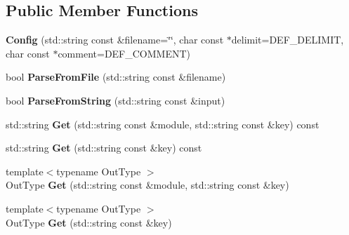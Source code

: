 \subsection*{Public Member Functions}
\begin{DoxyCompactItemize}
\item 
\hypertarget{classlsf_1_1util_1_1Config_a4d2115b08efe9a4025522d699b724623}{
{\bfseries Config} (std::string const \&filename=\char`\"{}\char`\"{}, char const $\ast$delimit=DEF\_\-DELIMIT, char const $\ast$comment=DEF\_\-COMMENT)}
\label{classlsf_1_1util_1_1Config_a4d2115b08efe9a4025522d699b724623}

\item 
\hypertarget{classlsf_1_1util_1_1Config_a1e5580078518ee262f8028c4a170ceb3}{
bool {\bfseries ParseFromFile} (std::string const \&filename)}
\label{classlsf_1_1util_1_1Config_a1e5580078518ee262f8028c4a170ceb3}

\item 
\hypertarget{classlsf_1_1util_1_1Config_a218bd716ead97bea8f600a3ff28b2a86}{
bool {\bfseries ParseFromString} (std::string const \&input)}
\label{classlsf_1_1util_1_1Config_a218bd716ead97bea8f600a3ff28b2a86}

\item 
\hypertarget{classlsf_1_1util_1_1Config_aac402180787045977191ae8c42d56a84}{
std::string {\bfseries Get} (std::string const \&module, std::string const \&key) const }
\label{classlsf_1_1util_1_1Config_aac402180787045977191ae8c42d56a84}

\item 
\hypertarget{classlsf_1_1util_1_1Config_a312b90e981e55c0ee10efe5bc133dfe8}{
std::string {\bfseries Get} (std::string const \&key) const }
\label{classlsf_1_1util_1_1Config_a312b90e981e55c0ee10efe5bc133dfe8}

\item 
\hypertarget{classlsf_1_1util_1_1Config_affbc99c661bf910671e4c3ebc755a74b}{
{\footnotesize template$<$typename OutType $>$ }\\OutType {\bfseries Get} (std::string const \&module, std::string const \&key)}
\label{classlsf_1_1util_1_1Config_affbc99c661bf910671e4c3ebc755a74b}

\item 
\hypertarget{classlsf_1_1util_1_1Config_a830ae36eed4712224a94ed9098e3d75a}{
{\footnotesize template$<$typename OutType $>$ }\\OutType {\bfseries Get} (std::string const \&key)}
\label{classlsf_1_1util_1_1Config_a830ae36eed4712224a94ed9098e3d75a}


\end{DoxyCompactItemize}
